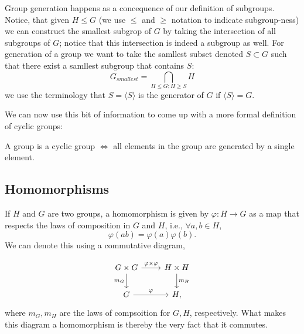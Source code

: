 \documentclass[12pt,oneside]{report}
\begin{document}
\begin{definition}
  Group generation happens as a concequence of our definition of subgroups. Notice, that given \( H \le G \) (we use \( \le\) and \(\ge \) notation to indicate subgroup-ness) we can construct the smallest subgrop of \( G \) by taking the intersection of all subgroups of \( G \); notice that this intersection is indeed a subgroup as well. For generation of a group we want to take the samllest subset denoted \( S \subset G\) such that there exist a samllest subgroup that contains \( S \):
  \begin{displaymath}
    G_{smallest}=\bigcap_{H\le G; H\ge S} H
  \end{displaymath}
  we use the terminology that \( S= \langle S \rangle  \) is the generator of \( G \) if \( \langle S \rangle = G \).
\end{definition}

We can now use this bit of information to come up with a more formal definition of cyclic groups:

\begin{definition}
  A group is a cyclic group \( \iff \) all elements in the group are generated by a single element.
\end{definition}

\subsection{Homomorphisms}
\begin{definition}[Homomorphisms]
  If \( H \) and \( G \) are two groups, a homomorphism is given by \( \varphi : H \to  G \) as a map that respects the laws of composition in \( G \) and \( H \), i.e., \( \forall a,b\in H \),
  \begin{displaymath}
    \varphi (ab)=\varphi (a)\varphi (b).
  \end{displaymath}
  We can denote this using a commutative diagram,

  \[
    \begin{tikzcd}
G \times  G\arrow{r}{\varphi \times  \varphi } \arrow[swap]{d}{m_G} & H \times  H \arrow{d}{m_H} \\%
G \arrow{r}{\varphi}& H,
\end{tikzcd}
\] 
where \( m_G, m_H \) are the laws of compsoition for \( G,H \), respectively. What makes this diagram a homomorphism is thereby the very fact that it commutes. 
\end{definition}
\end{document}
